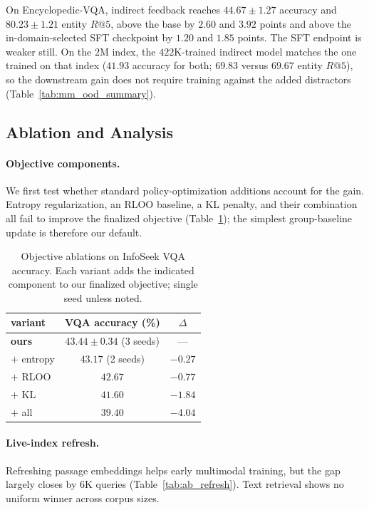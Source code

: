 On Encyclopedic-VQA, indirect feedback reaches $44.67\pm1.27$ accuracy and $80.23\pm1.21$ entity
$R@5$, above the base by $2.60$ and $3.92$ points and above the in-domain-selected SFT checkpoint
by $1.20$ and $1.85$ points. The SFT endpoint is weaker still. On the $2$M index, the
$422$K-trained indirect model matches the one trained on that index ($41.93$ accuracy for both;
$69.83$ versus $69.67$ entity $R@5$), so the downstream gain does not require training against the
added distractors (Table~\ref{tab:mm_ood_summary}).

\subsection{Ablation and Analysis}
\label{sec:rag_ablation}

\paragraph{Objective components.} We first test whether standard policy-optimization additions account for the gain. Entropy
regularization, an RLOO baseline, a KL penalty, and their combination all fail to improve the
finalized objective (Table~\ref{tab:mm_v3add}); the simplest group-baseline update is therefore our
default.

\begin{table}[H]
\centering\small
\caption{Objective ablations on InfoSeek VQA accuracy. Each variant adds the indicated component to
our finalized objective; single seed unless noted.}
\label{tab:mm_v3add}
\begin{tabular}{lcc}
\toprule
variant & VQA accuracy (\%) & $\Delta$ \\
\midrule
\textbf{ours} & $\mathbf{43.44 \pm 0.34}$ (3 seeds) & --- \\
$+$ entropy & $43.17$ (2 seeds) & $-0.27$ \\
$+$ RLOO & $42.67$ & $-0.77$ \\
$+$ KL & $41.60$ & $-1.84$ \\
$+$ all & $39.40$ & $-4.04$ \\
\bottomrule
\end{tabular}
\end{table}

\paragraph{Live-index refresh.} Refreshing passage embeddings helps early multimodal training, but
the gap largely closes by $6$K queries (Table~\ref{tab:ab_refresh}). Text retrieval shows no uniform
winner across corpus sizes.

